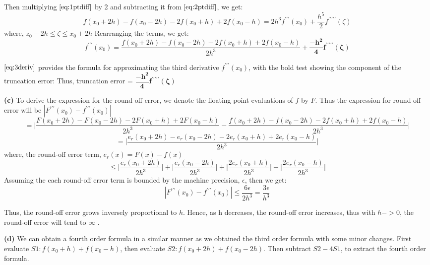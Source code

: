 \documentclass{article}
\renewcommand\part[1]{\vspace{.10in}\textbf{(#1)}}
\begin{document}
  Then multiplying $\eqref{eq:1ptdiff}$ by 2 and subtracting it from $\eqref{eq:2ptdiff}$, we get:
  \[ f(x_0 + 2h) - f(x_0 - 2h) - 2f(x_0 + h) + 2f(x_0-h) = 2h^3f^{\prime\prime\prime}(x_0) + \dfrac{h^5}{2}f^{\prime\prime\prime\prime\prime}(\zeta) \]
  where, $z_0 - 2h \leq \zeta \leq x_0 + 2h$
  Rearranging the terms, we get:
  \begin{equation}
	  f^{\prime\prime\prime}(x_0) = \dfrac{f(x_0 + 2h) - f(x_0 - 2h) - 2f(x_0 + h) + 2f(x_0-h)}{2h^3} + \mathbf{\dfrac{-h^2}{4}f^{\prime\prime\prime\prime\prime}(\zeta)}
	  \label{eq:3deriv}
  \end{equation}

  $\eqref{eq:3deriv}$ provides the formula for approximating the third derivative $f^{\prime\prime\prime}(x_0)$, with the bold test showing the component of the truncation error:
  Thus, truncation error = $\mathbf{\dfrac{-h^2}{4}f^{\prime\prime\prime\prime\prime}(\zeta)}$

  \part{c} To derive the expression for the round-off error, we denote the floating point evaluations of $f$ by $F$. Thus the expression for round off error will be $|F^{\prime\prime\prime}(x_0) - f^{\prime\prime\prime}(x_0)|$ \[ = \bigg |  \dfrac{F(x_0 + 2h) - F(x_0 - 2h) - 2F(x_0 + h) + 2F(x_0-h)}{2h^3} - \dfrac{f(x_0 + 2h) - f(x_0 - 2h) - 2f(x_0 + h) + 2f(x_0-h)}{2h^3} \bigg |\]
  \[= \bigg |  \dfrac{e_r(x_0+2h) - e_r(x_0-2h) -2e_r(x_0+h) + 2e_r(x_0-h)}{2h^3}  \bigg |\]
  where, the round-off error term, $e_r(x) = F(x) - f(x)$
  \[\leq \bigg | \dfrac{e_r(x_0 + 2h)}{2h^3}\bigg | + \bigg | \dfrac{e_r(x_0 - 2h)}{2h^3}\bigg | + \bigg | \dfrac{2e_r(x_0 + h)}{2h^3}\bigg | + \bigg | \dfrac{2e_r(x_0 - h)}{2h^3}\bigg |\]
  Assuming the each round-off error term is bounded by the machine precision, $\epsilon$, then we get:
  \[ |F^{\prime\prime\prime}(x_0) - f^{\prime\prime\prime}(x_0)| \leq \dfrac{6\epsilon}{2h^3} = \dfrac{3\epsilon}{h^3} \]

  Thus, the round-off error grows inversely proportional to $h$. Hence, as h decreases, the round-off error increases, thus with $h->0$, the round-off error will tend to $\infty$ .

  \part{d} We can obtain a fourth order formula in a similar manner as we obtained the third order formula with some minor changes. First evaluate $S1: f(x_0 + h) + f(x_0 - h)$, then evaluate $S2: f(x_0 + 2h) + f(x_0 - 2h)$. Then subtract $S2 - 4S1$, to extract the fourth order formula.
\end{document}
